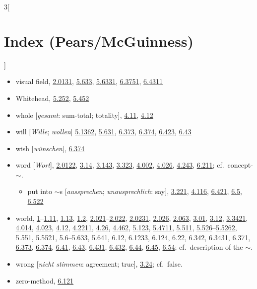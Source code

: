 \documentclass[oneside,openany,12pt]{book}
\newcommand{\indexentry}[1]{\item #1}
\newcommand{\indexsubentry}[1]{\begin{itemize} \item #1 \end{itemize}}
\newcommand{\indexref}[1]{\hyperlink{prop#1}{#1}}
\newcommand{\indexgap}{\bigskip}
\begin{document}
\begin{multicols}{3}[\section*{Index (Pears/McGuinness)}]
\begin{itemize}
   \indexsubentry{propositional $\sim$ [\textit{Satzvariable}], \indexref{3.313}, \indexref{3.317}, \indexref{4.126}, \indexref{4.127}, \indexref{5.502}}

   \indexsubentry{$\sim$ name, \indexref{3.314}, \indexref{4.1272}}

   \indexsubentry{$\sim$ number, \indexref{6.022}}

   \indexsubentry{$\sim$ proposition [\textit{variabler Satz}], \indexref{3.315}}

\indexentry{visual field, \indexref{2.0131}, \indexref{5.633}, \indexref{5.6331}, \indexref{6.3751}, \indexref{6.4311}}

\indexgap

\indexentry{Whitehead, \indexref{5.252}, \indexref{5.452}}

\indexentry{whole [\textit{gesamt}: sum-total; totality], \indexref{4.11}, \indexref{4.12}}

\indexentry{will [\textit{Wille}; \textit{wollen}] \indexref{5.1362}, \indexref{5.631}, \indexref{6.373}, \indexref{6.374}, \indexref{6.423}, \indexref{6.43}}

\indexentry{wish [\textit{w{\"u}nschen}], \indexref{6.374}}

\indexentry{word [\textit{Wort}], \indexref{2.0122}, \indexref{3.14}, \indexref{3.143}, \indexref{3.323}, \indexref{4.002}, \indexref{4.026}, \indexref{4.243}, \indexref{6.211}; cf.\ concept-$\sim$.}

   \indexsubentry{put into $\sim$s [\textit{aussprechen}; \textit{unausprechlich}: say], \indexref{3.221}, \indexref{4.116}, \indexref{6.421}, \indexref{6.5}, \indexref{6.522}}

\indexentry{world, \indexref{1}--\indexref{1.11}, \indexref{1.13}, \indexref{1.2}, \indexref{2.021}--\indexref{2.022}, \indexref{2.0231}, \indexref{2.026}, \indexref{2.063}, \indexref{3.01}, \indexref{3.12}, \indexref{3.3421}, \indexref{4.014}, \indexref{4.023}, \indexref{4.12}, \indexref{4.2211}, \indexref{4.26}, \indexref{4.462}, \indexref{5.123}, \indexref{5.4711}, \indexref{5.511}, \indexref{5.526}--\indexref{5.5262}, \indexref{5.551}, \indexref{5.5521}, \indexref{5.6}--\indexref{5.633}, \indexref{5.641}, \indexref{6.12}, \indexref{6.1233}, \indexref{6.124}, \indexref{6.22}, \indexref{6.342}, \indexref{6.3431}, \indexref{6.371}, \indexref{6.373}, \indexref{6.374}, \indexref{6.41}, \indexref{6.43}, \indexref{6.431}, \indexref{6.432}, \indexref{6.44}, \indexref{6.45}, \indexref{6.54}; cf.\ description of the $\sim$.}

\indexentry{wrong [\textit{nicht stimmen}: agreement; true], \indexref{3.24}; cf.\ false.}

\indexgap

\indexentry{zero-method, \indexref{6.121}}
\end{itemize}
\end{multicols}
\end{document}

